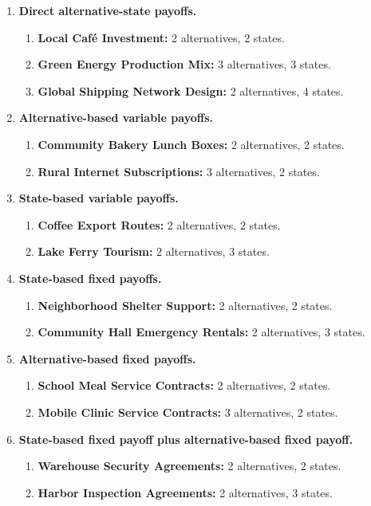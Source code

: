 	\begin{enumerate}
		\item \textbf{Direct alternative-state payoffs.}
		\begin{enumerate}
			\item \textbf{Local Café Investment:} 2 alternatives, 2 states.
			\item \textbf{Green Energy Production Mix:} 3 alternatives, 3 states.
			\item \textbf{Global Shipping Network Design:} 2 alternatives, 4 states.
		\end{enumerate}
		
		\item \textbf{Alternative-based variable payoffs.}
		\begin{enumerate}
			\item \textbf{Community Bakery Lunch Boxes:} 2 alternatives, 2 states.
			\item \textbf{Rural Internet Subscriptions:} 3 alternatives, 2 states.
		\end{enumerate}
		
		\item \textbf{State-based variable payoffs.}
		\begin{enumerate}
			\item \textbf{Coffee Export Routes:} 2 alternatives, 2 states.
			\item \textbf{Lake Ferry Tourism:} 2 alternatives, 3 states.
		\end{enumerate}
		
		\item \textbf{State-based fixed payoffs.}
		\begin{enumerate}
			\item \textbf{Neighborhood Shelter Support:} 2 alternatives, 2 states.
			\item \textbf{Community Hall Emergency Rentals:} 2 alternatives, 3 states.
		\end{enumerate}
		
		\item \textbf{Alternative-based fixed payoffs.}
		\begin{enumerate}
			\item \textbf{School Meal Service Contracts:} 2 alternatives, 2 states.
			\item \textbf{Mobile Clinic Service Contracts:} 3 alternatives, 2 states.
		\end{enumerate}
		
		\item \textbf{State-based fixed payoff plus alternative-based fixed payoff.}
		\begin{enumerate}
			\item \textbf{Warehouse Security Agreements:} 2 alternatives, 2 states.
			\item \textbf{Harbor Inspection Agreements:} 2 alternatives, 3 states.
		\end{enumerate}
		

\end{enumerate}
